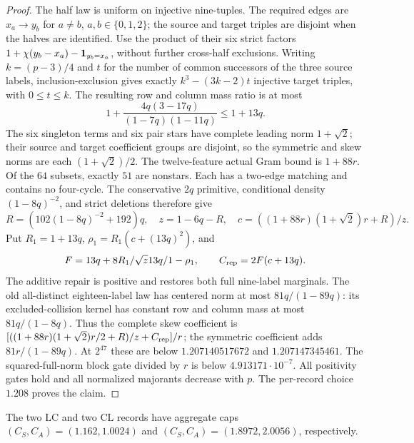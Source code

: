 \begin{proof}
The half law is uniform on injective nine-tuples. The required edges
are $x_a\longrightarrow y_b$ for $a\ne b$, $a,b\in\{0,1,2\}$;
the source and target triples are disjoint when the halves are identified.
Use the product of their six strict factors
$1+\chi(y_b-x_a)-\one_{y_b=x_a}$, without further cross-half exclusions.
Writing $k=(p-3)/4$ and $t$ for the number of common successors of the
three source labels, inclusion-exclusion gives exactly
$k^3-(3k-2)t$ injective target triples, with $0\le t\le k$.
The resulting row and column mass ratio is at most
\[
 1+\frac{4q(3-17q)}{(1-7q)(1-11q)}\le1+13q.
\]
The six singleton terms and six pair stars have complete leading
norm $1+\sqrt2$; their source and target coefficient groups are
disjoint, so the symmetric and skew norms are each
$(1+\sqrt2)/2$. The twelve-feature actual Gram bound is $1+88r$.
Of the $64$ subsets, exactly $51$ are nonstars. Each has a two-edge
matching and contains no four-cycle. The conservative $2q$ primitive,
conditional density $(1-8q)^{-2}$, and strict deletions therefore give
\[
 R=(102(1-8q)^{-2}+192)q,\quad z=1-6q-R,\quad
 c=((1+88r)(1+\sqrt2)r+R)/z.
\]
Put $R_1=1+13q$, $\rho_1=R_1(c+(13q)^2)$, and
\[
 F=13q+\frac{8R_1}{\sqrt z}\frac{13q}{1-\rho_1},\qquad
 C_{\rm rep}=2F(c+13q).
\]
The additive repair is positive and restores both full nine-label
marginals. The old all-distinct eighteen-label law has centered norm
at most $81q/(1-89q)$: its excluded-collision kernel has constant
row and column mass at most $81q/(1-8q)$.
Thus the complete skew coefficient is
$[((1+88r)(1+\sqrt2)r/2+R)/z+C_{\rm rep}]/r$;
the symmetric coefficient adds $81r/(1-89q)$.
At $2^{47}$ these are below $1.207140517672$ and $1.207147345461$.
The squared-full-norm block gate divided by $r$ is below
$4.913171\cdot10^{-7}$. All positivity gates hold and all normalized
majorants decrease with $p$. The per-record choice $1.208$ proves the claim.
\end{proof}

\begin{proposition}\label{prop:upper-constant-six}
The two $\mathrm{LC}$ and two $\mathrm{CL}$ records have aggregate caps
$(C_S,C_A)=(1.162,1.0024)$ and $(C_S,C_A)=(1.8972,2.0056)$,
respectively.
\end{proposition}

